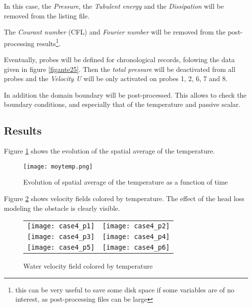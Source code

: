 In this case, the {\itshape Pressure}, the {\itshape Tubulent energy} and the
{\itshape Dissipation} will be removed from the listing file.

The {\itshape Courant number} (CFL) and {\itshape Fourier number} will be
removed from the
post-processing results\footnote{this can be very useful to save some disk space
if some variables are of no interest, as post-processing files can be large}.

Eventually, probes will be defined for chronological records, folowing the data
given in figure \ref{figante25}. Then the {\itshape total pressure} will be
deactivated from all probes and the {\itshape Velocity U} will be only activated
on probes  1, 2, 6, 7 and 8.


In addition the domain boundary will be post-processed. This allows to check the
boundary conditions, and especially that of the temperature and passive scalar.



        \subsection{Results}
Figure \ref{fige2_e4} shows the evolution of the spatial average of the temperature.

\begin{figure}[h]
\begin{center}
\texttt{[image: moytemp.png]}
\caption{Evolution of spatial average of the temperature as a function of time}
\label{fige2_e4}
\end{center}
\end{figure}

Figure \ref{fige1_e4} shows velocity fields colored by temperature. The effect
of the head loss modeling the obstacle is clearly visible.

\begin{figure}
\begin{center}
\begin{tabular}{cc}
\texttt{[image: case4\_p1]} &
\texttt{[image: case4\_p2]} \\
\texttt{[image: case4\_p3]} &
\texttt{[image: case4\_p4]} \\
\texttt{[image: case4\_p5]} &
\texttt{[image: case4\_p6]} \\
\end{tabular}
\caption{Water velocity field colored by temperature}
\label{fige1_e4}
\end{center}
\end{figure}


